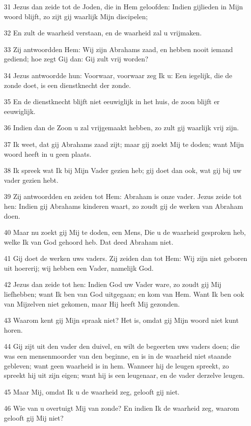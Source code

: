 \par 31 Jezus dan zeide tot de Joden, die in Hem geloofden: Indien gijlieden in Mijn woord blijft, zo zijt gij waarlijk Mijn discipelen;
\par 32 En zult de waarheid verstaan, en de waarheid zal u vrijmaken.
\par 33 Zij antwoordden Hem: Wij zijn Abrahams zaad, en hebben nooit iemand gediend; hoe zegt Gij dan: Gij zult vrij worden?
\par 34 Jezus antwoordde hun: Voorwaar, voorwaar zeg Ik u: Een iegelijk, die de zonde doet, is een dienstknecht der zonde.
\par 35 En de dienstknecht blijft niet eeuwiglijk in het huis, de zoon blijft er eeuwiglijk.
\par 36 Indien dan de Zoon u zal vrijgemaakt hebben, zo zult gij waarlijk vrij zijn.
\par 37 Ik weet, dat gij Abrahams zaad zijt; maar gij zoekt Mij te doden; want Mijn woord heeft in u geen plaats.
\par 38 Ik spreek wat Ik bij Mijn Vader gezien heb; gij doet dan ook, wat gij bij uw vader gezien hebt.
\par 39 Zij antwoordden en zeiden tot Hem: Abraham is onze vader. Jezus zeide tot hen: Indien gij Abrahams kinderen waart, zo zoudt gij de werken van Abraham doen.
\par 40 Maar nu zoekt gij Mij te doden, een Mens, Die u de waarheid gesproken heb, welke Ik van God gehoord heb. Dat deed Abraham niet.
\par 41 Gij doet de werken uws vaders. Zij zeiden dan tot Hem: Wij zijn niet geboren uit hoererij; wij hebben een Vader, namelijk God.
\par 42 Jezus dan zeide tot hen: Indien God uw Vader ware, zo zoudt gij Mij liefhebben; want Ik ben van God uitgegaan; en kom van Hem. Want Ik ben ook van Mijzelven niet gekomen, maar Hij heeft Mij gezonden.
\par 43 Waarom kent gij Mijn spraak niet? Het is, omdat gij Mijn woord niet kunt horen.
\par 44 Gij zijt uit den vader den duivel, en wilt de begeerten uws vaders doen; die was een mensenmoorder van den beginne, en is in de waarheid niet staande gebleven; want geen waarheid is in hem. Wanneer hij de leugen spreekt, zo spreekt hij uit zijn eigen; want hij is een leugenaar, en de vader derzelve leugen.
\par 45 Maar Mij, omdat Ik u de waarheid zeg, gelooft gij niet.
\par 46 Wie van u overtuigt Mij van zonde? En indien Ik de waarheid zeg, waarom gelooft gij Mij niet?
